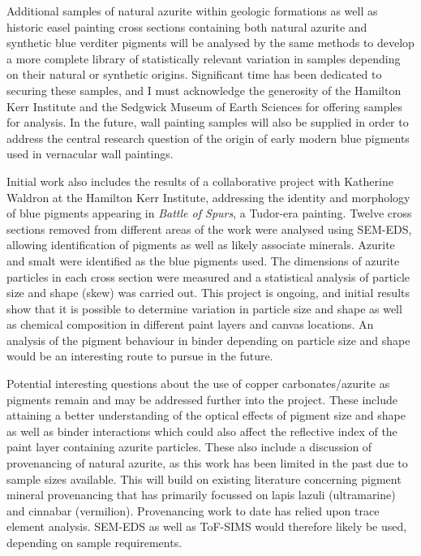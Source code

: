 Additional samples of natural azurite within geologic formations as well as historic easel painting cross sections containing both natural azurite and synthetic blue verditer pigments will be analysed by the same methods to develop a more complete library of statistically relevant variation in samples depending on their natural or synthetic origins. Significant time has been dedicated to securing these samples, and I must acknowledge the generosity of the Hamilton Kerr Institute and the Sedgwick Museum of Earth Sciences for offering samples for analysis. In the future, wall painting samples will also be supplied in order to address the central research question of the origin of early modern blue pigments used in vernacular wall paintings. 

Initial work also includes the results of a collaborative project with Katherine Waldron at the Hamilton Kerr Institute, addressing the identity and morphology of blue pigments appearing in \textit{Battle of Spurs}, a Tudor-era painting. Twelve cross sections removed from different areas of the work were analysed using SEM-EDS, allowing identification of pigments as well as likely associate minerals. Azurite and smalt were identified as the blue pigments used. The dimensions of azurite particles in each cross section were measured and a statistical analysis of particle size and shape (skew) was carried out. This project is ongoing, and initial results show that it is possible to determine variation in particle size and shape as well as chemical composition in different paint layers and canvas locations. An analysis of the pigment behaviour in binder depending on particle size and shape would be an interesting route to pursue in the future. 

Potential interesting questions about the use of copper carbonates/azurite as pigments remain and may be addressed further into the project. These include attaining a better understanding of the optical effects of pigment size and shape as well as binder interactions which could also affect the reflective index of the paint layer containing azurite particles. These also include a discussion of provenancing of natural azurite, as this work has been limited in the past due to sample sizes available. This will build on existing literature concerning pigment mineral provenancing that has primarily focussed on lapis lazuli (ultramarine) and cinnabar (vermilion). Provenancing work to date has relied upon trace element analysis. SEM-EDS as well as ToF-SIMS would therefore likely be used, depending on sample requirements. 


